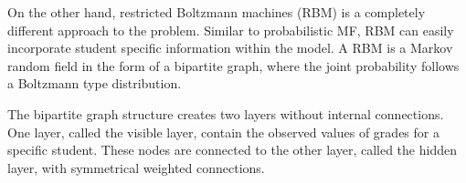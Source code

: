 \documentclass[12pt]{article}
\begin{document}
On the other hand, restricted Boltzmann machines (RBM) is a
completely different approach to the problem.
Similar to probabilistic MF, RBM can easily incorporate
student specific information within the model.
A RBM is a Markov random field in the form of a bipartite graph,
where the joint probability follows a Boltzmann type distribution.

\def\layersep{2.5cm}


The bipartite graph structure creates two layers without
internal connections.
One layer, called the visible layer, contain the 
observed values of grades for a specific student.
These nodes are connected to the other layer, called the hidden layer,
with symmetrical weighted connections.
\end{document}
